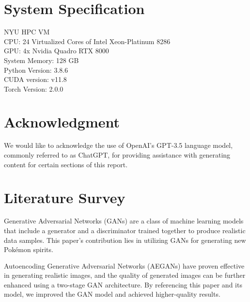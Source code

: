 \documentclass[letterpaper]{article} %
\begin{document}

\section{System Specification}
NYU HPC VM \\
CPU: 24 Virtualized Cores of Intel Xeon-Platinum 8286 \\
GPU: 4x Nvidia Quadro RTX 8000 \\
System Memory: 128 GB \\
Python Version: 3.8.6 \\
CUDA version: v11.8 \\
Torch Version: 2.0.0 \\

\section{Acknowledgment}
We would like to acknowledge the use of OpenAI's GPT-3.5 language model, commonly referred to as ChatGPT, for providing assistance with generating content for certain sections of this report.
\section{Literature Survey}
Generative Adversarial Networks (GANs) \cite{GAN} are a class of machine learning models that include a generator and a discriminator trained together to produce realistic data samples. This paper's contribution lies in utilizing GANs for generating new Pokémon spirits.

Autoencoding Generative Adversarial Networks (AEGANs) \cite{AEGAN} have proven effective in generating realistic images, and the quality of generated images can be further enhanced using a two-stage GAN architecture. By referencing this paper and its model, we improved the GAN model and achieved higher-quality results.
\end{document}
